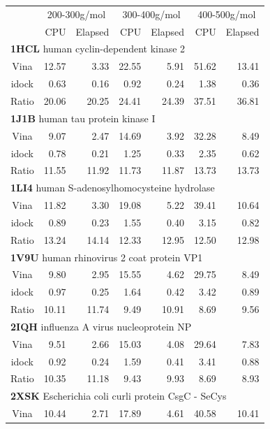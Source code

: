 \begin{table}
\centering
\begin{tabular*}
{\linewidth}
{@{\extracolsep{\fill}}crrrrrr}
\toprule
& \multicolumn{2}{c}{200-300g/mol} & \multicolumn{2}{c}{300-400g/mol} & \multicolumn{2}{c}{400-500g/mol}\\
& CPU & Elapsed & CPU & Elapsed & CPU & Elapsed\\
\midrule
\multicolumn{7}{l}{\textbf{1HCL} human cyclin-dependent kinase 2}\\
Vina  & 12.57 &  3.33 & 22.55 &  5.91 & 51.62 & 13.41\\
idock &  0.63 &  0.16 &  0.92 &  0.24 &  1.38 &  0.36\\
Ratio & 20.06 & 20.25 & 24.41 & 24.39 & 37.51 & 36.81\\
\multicolumn{7}{l}{\textbf{1J1B} human tau protein kinase I}\\
Vina  &  9.07 &  2.47 & 14.69 &  3.92 & 32.28 &  8.49\\
idock &  0.78 &  0.21 &  1.25 &  0.33 &  2.35 &  0.62\\
Ratio & 11.55 & 11.92 & 11.73 & 11.87 & 13.73 & 13.73\\
\multicolumn{7}{l}{\textbf{1LI4} human S-adenosylhomocysteine hydrolase}\\
Vina  & 11.82 &  3.30 & 19.08 &  5.22 & 39.41 & 10.64\\
idock &  0.89 &  0.23 &  1.55 &  0.40 &  3.15 &  0.82\\
Ratio & 13.24 & 14.14 & 12.33 & 12.95 & 12.50 & 12.98\\
\multicolumn{7}{l}{\textbf{1V9U} human rhinovirus 2 coat protein VP1}\\
Vina  &  9.80 &  2.95 & 15.55 &  4.62 & 29.75 &  8.49\\
idock &  0.97 &  0.25 &  1.64 &  0.42 &  3.42 &  0.89\\
Ratio & 10.11 & 11.74 &  9.49 & 10.91 &  8.69 &  9.56\\
\multicolumn{7}{l}{\textbf{2IQH} influenza A virus nucleoprotein NP}\\
Vina  &  9.51 &  2.66 & 15.03 &  4.08 & 29.64 &  7.83\\
idock &  0.92 &  0.24 &  1.59 &  0.41 &  3.41 &  0.88\\
Ratio & 10.35 & 11.18 &  9.43 &  9.93 &  8.69 &  8.93\\
\multicolumn{7}{l}{\textbf{2XSK} Escherichia coli curli protein CsgC - SeCys}\\
Vina  & 10.44 &  2.71 & 17.89 &  4.61 & 40.58 & 10.41\\

\end{tabular*}
\end{table}
